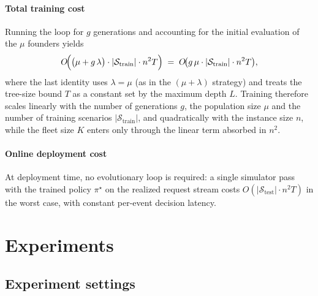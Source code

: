 \documentclass[pdflatex]{sn-jnl}
\begin{document}
\paragraph{Total training cost}
Running the loop for $g$ generations and accounting for the initial
evaluation of the $\mu$ founders yields
\begin{equation}
\label{eq:cost-total}
O\!\Bigl(\bigl(\mu + g\,\lambda\bigr)\cdot|\mathcal{S}_{\text{train}}|\cdot
n^2 T\Bigr)
\;=\;
O\!\bigl(g\,\mu\cdot|\mathcal{S}_{\text{train}}|\cdot n^2 T\bigr),
\end{equation}
where the last identity uses $\lambda=\mu$ (as in the $(\mu+\lambda)$ strategy) and treats
the tree-size bound $T$ as a constant set by the maximum depth $L$.
Training therefore scales linearly with the number of generations
$g$, the population size $\mu$ and the number of training scenarios
$|\mathcal{S}_{\text{train}}|$, and quadratically with the instance size $n$, while
the fleet size $K$ enters only through the linear term absorbed in
$n^2$.

\paragraph{Online deployment cost}
At deployment time, no evolutionary loop is required: a single
simulator pass with the trained policy $\pi^\star$ on the realized
request stream costs $O(|\mathcal{S}_{\text{test}}| \cdot n^2 T)$ in the worst case, with constant
per-event decision latency.

\section{Experiments} \label{sec:exp}
\subsection{Experiment settings}
\end{document}
